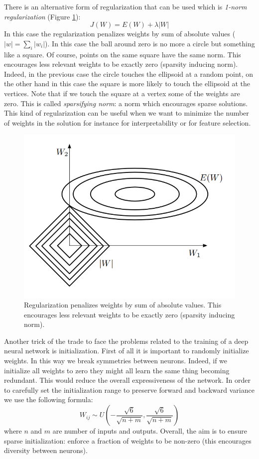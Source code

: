 There is an alternative form of regularization that can be used which is \textit{1-norm regularization} (Figure \ref{fig::1NormRegularization}):
$$J(W) = E(W) + \lambda |W|$$
In this case the regularization penalizes weights by sum of absolute values ($|w| = \sum_i |w_i|$). In this case the ball around zero is no more a circle but something like a square. Of course, points on the same square have the same norm. This encourages less relevant weights to be exactly zero (sparsity inducing norm). Indeed, in the previous case the circle touches the ellipsoid at a random point, on the other hand in this case the square is more likely to touch the ellipsoid at the vertices. Note that if we touch the square at a vertex some of the weights are zero. This is called \textit{sparsifying norm}: a norm which encourages sparse solutions. This kind of regularization can be useful when we want to minimize the number of weights in the solution for instance for interpretability or for feature selection. \newline

\begin{figure}
    \centering
    \includegraphics[scale=0.5]{images/1NormRegularization.png}
    \caption{Regularization penalizes weights by sum of absolute values. This encourages less relevant weights to be exactly zero (sparsity inducing norm).}
    \label{fig::1NormRegularization}
\end{figure}

Another trick of the trade to face the problems related to the training of a deep neural network is initialization. First of all it is important to randomly initialize weights. In this way we break symmetries between neurons. Indeed, if we initialize all weights to zero they might all learn the same thing becoming redundant. This would reduce the overall expressiveness of the network. In order to carefully set the initialization range to preserve forward and backward variance we use the following formula:
$$W_{ij} \sim U(- \frac{\sqrt{6}}{\sqrt{n+m}}, \frac{\sqrt{6}}{\sqrt{n+m}})$$
where $n$ and $m$ are number of inputs and outputs. Overall, the aim is to ensure sparse initialization: enforce a fraction of weights to be non-zero (this encourages diversity between neurons). \newline

